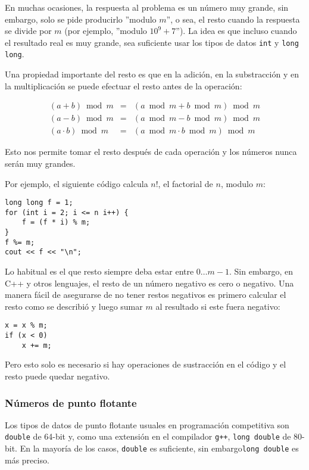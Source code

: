 En muchas ocasiones, la respuesta al
problema es un n\'umero muy grande,
sin embargo, solo se pide producirlo
''modulo $m$'', o sea,
el resto cuando la respuesta se divide
por $m$ (por ejemplo, ''modulo $10^9+7$'').
La idea es que incluso cuando el resultado
real es muy grande, sea suficiente usar
los tipos de datos
\texttt{int} y \texttt{long long}.

Una propiedad importante del resto es
que en la adici\'on, en la substracci\'on y en la
multiplicaci\'on se puede efectuar el resto
antes de la operaci\'on:

\[
\begin{array}{rcr}
(a+b) \bmod m & = & (a \bmod m + b \bmod m) \bmod m \\
(a-b) \bmod m & = & (a \bmod m - b \bmod m) \bmod m \\
(a \cdot b) \bmod m & = & (a \bmod m \cdot b \bmod m) \bmod m
\end{array}
\]

Esto nos permite tomar el resto despu\'es de cada
operaci\'on y los n\'umeros nunca ser\'an muy grandes.

Por ejemplo, el siguiente c\'odigo calcula $n!$,
el factorial de $n$, modulo $m$:
\begin{lstlisting}
long long f = 1;
for (int i = 2; i <= n i++) {
    f = (f * i) % m;
}
f %= m;
cout << f << "\n";
\end{lstlisting}

Lo habitual es el que resto siempre
deba estar entre $0\ldots m-1$.
Sin embargo, en C++ y otros lenguajes,
el resto de un n\'umero negativo
es cero o negativo. Una manera f\'acil
de asegurarse de no tener restos
negativos es primero calcular el resto
como se describi\'o y luego sumar $m$
al resultado si este fuera negativo:

\begin{lstlisting}
x = x % m;
if (x < 0)
    x += m;
\end{lstlisting}

Pero esto solo es necesario si hay
operaciones de sustracci\'on en el c\'odigo
y el resto puede quedar negativo.

\subsubsection{N\'umeros de punto flotante}


Los tipos de datos de punto flotante usuales
en programaci\'on competitiva son
\texttt{double} de 64-bit y, como una extensi\'on
en el compilador \texttt{g++}, \texttt{long double}
de 80-bit. En la mayor\'ia de los casos, \texttt{double}
es suficiente, sin embargo\texttt{long double} es m\'as
preciso.


